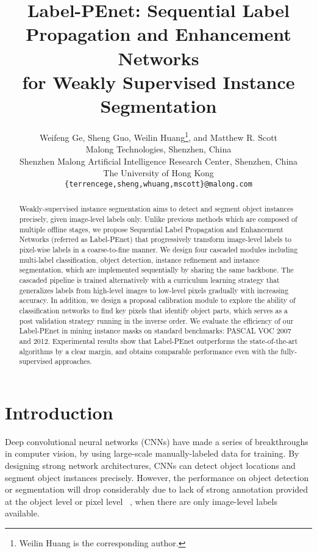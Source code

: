 \documentclass[10pt,twocolumn,letterpaper]{article}
\begin{document}
\title{Label-PEnet: Sequential Label Propagation and Enhancement Networks \\ for Weakly Supervised Instance Segmentation }




 \author{Weifeng Ge, Sheng Guo, Weilin Huang\thanks{Weilin Huang is the corresponding author.}, and Matthew R. Scott\\
Malong Technologies, Shenzhen, China \\
Shenzhen Malong Artificial Intelligence Research Center, Shenzhen, China\\
The University of Hong Kong\\
{\tt\small {\{terrencege,sheng,whuang,mscott\}@malong.com}}
}

\maketitle
\ificcvfinal\thispagestyle{empty}\fi

\begin{abstract}
	
Weakly-supervised instance segmentation aims to detect and segment object instances precisely, given image-level labels only.
Unlike previous methods which are composed of multiple offline stages, we propose Sequential Label Propagation and Enhancement Networks (referred as Label-PEnet) that progressively transform image-level labels to pixel-wise labels in a coarse-to-fine manner.
We design four cascaded modules including multi-label classification, object detection, instance refinement and instance segmentation, which are implemented sequentially by sharing the same backbone. The cascaded pipeline is trained alternatively with a curriculum learning strategy that generalizes labels from high-level images to low-level pixels gradually with increasing accuracy.
In addition, we design a proposal calibration module to explore the ability of classification networks to find key pixels that identify object parts, which serves as a post validation strategy running in the inverse order.
We evaluate the efficiency of our Label-PEnet in mining instance masks on standard benchmarks: PASCAL VOC 2007 and 2012. Experimental results show that Label-PEnet outperforms the state-of-the-art algorithms by a clear margin, and obtains comparable performance even with the fully-supervised approaches.
	
\end{abstract}

\section{Introduction}
Deep convolutional neural networks (CNNs) have made a series of breakthroughs in computer vision, by using large-scale manually-labeled data for training. By designing strong network architectures, CNNs can detect object locations and segment object instances precisely. However, the performance on object detection or segmentation will drop considerably due to lack of strong annotation provided at the object level or pixel level ~\cite{oquab2015object,diba2016weakly,ge2018multi,zhou2018weakly}, \ie when there are only image-level labels available.
\end{document}
